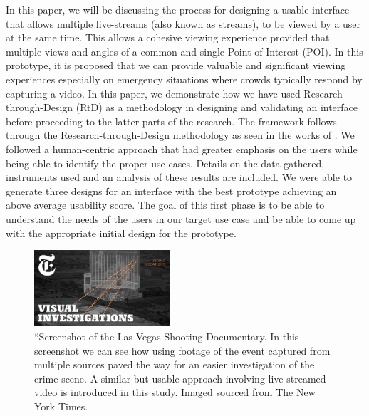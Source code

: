 \documentclass{sigchi}
\begin{document}
In this paper, we will be discussing the process for designing a usable interface that allows multiple live-streams (also known as streams), to be viewed by a user at the same time. This allows a cohesive viewing experience provided that multiple views and angles of a common and single Point-of-Interest (POI).  In this prototype, it is proposed that we can provide valuable and significant viewing experiences especially on emergency situations where crowds typically respond by capturing a video. In this paper, we demonstrate how we have used Research-through-Design (RtD) as a methodology in designing and validating an interface before proceeding to the latter parts of the research. The framework follows through the Research-through-Design methodology as seen in the works of \cite{deja2018myosl, deja2018flow, deja2018building, tamani2018}. We followed a human-centric approach that had greater emphasis on the users while being able to identify the proper use-cases.  Details on the data gathered, instruments used and an analysis of these results are included. We were able to generate three designs for an interface with the best prototype achieving an above average usability score. The goal of this first phase is to be able to understand the needs of the users in our target use case and be able to come up with the appropriate initial design for the prototype. 
\begin{figure}[t]
    \centering
    \includegraphics[width = 0.45\textwidth]{figures/lasvegasshooting.jpg}
    \caption{``Screenshot of the Las Vegas Shooting Documentary. In this screenshot we can see how using footage of the event captured from multiple sources paved the way for an easier investigation of the crime scene. A similar but usable approach involving live-streamed video is introduced in this study. Imaged sourced from The New York Times. }
    \label{fig:shooting}
\end{figure}
\end{document}
